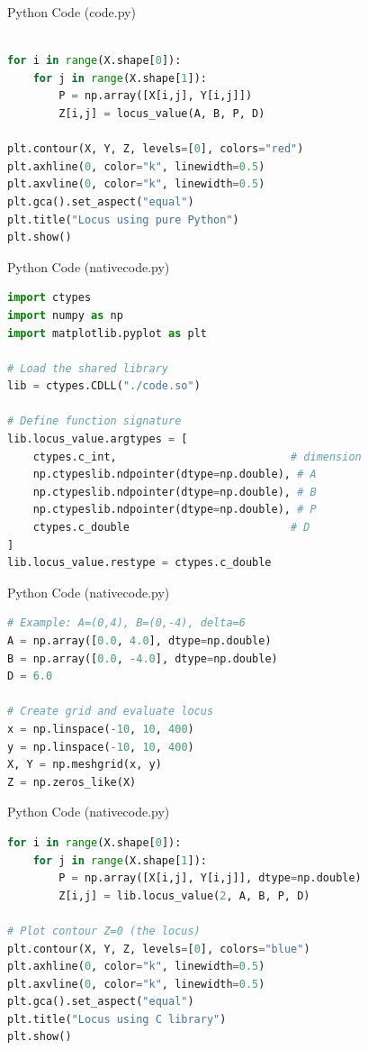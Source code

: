 \documentclass{beamer}
\begin{document}
\begin{frame}[fragile]{Python Code (code.py)}
\begin{lstlisting}[language=Python]

for i in range(X.shape[0]):
    for j in range(X.shape[1]):
        P = np.array([X[i,j], Y[i,j]])
        Z[i,j] = locus_value(A, B, P, D)

plt.contour(X, Y, Z, levels=[0], colors="red")
plt.axhline(0, color="k", linewidth=0.5)
plt.axvline(0, color="k", linewidth=0.5)
plt.gca().set_aspect("equal")
plt.title("Locus using pure Python")
plt.show()
\end{lstlisting}
\end{frame}
\begin{frame}[fragile]{Python Code (nativecode.py)}
\begin{lstlisting}[language=Python]
import ctypes
import numpy as np
import matplotlib.pyplot as plt

# Load the shared library
lib = ctypes.CDLL("./code.so")

# Define function signature
lib.locus_value.argtypes = [
    ctypes.c_int,                           # dimension
    np.ctypeslib.ndpointer(dtype=np.double), # A
    np.ctypeslib.ndpointer(dtype=np.double), # B
    np.ctypeslib.ndpointer(dtype=np.double), # P
    ctypes.c_double                         # D
]
lib.locus_value.restype = ctypes.c_double
\end{lstlisting}
\end{frame}
\begin{frame}[fragile]{Python Code (nativecode.py)}
\begin{lstlisting}[language=Python]
# Example: A=(0,4), B=(0,-4), delta=6
A = np.array([0.0, 4.0], dtype=np.double)
B = np.array([0.0, -4.0], dtype=np.double)
D = 6.0

# Create grid and evaluate locus
x = np.linspace(-10, 10, 400)
y = np.linspace(-10, 10, 400)
X, Y = np.meshgrid(x, y)
Z = np.zeros_like(X)
\end{lstlisting}
\end{frame}

\begin{frame}[fragile]{Python Code (nativecode.py)}
\begin{lstlisting}[language=Python]
for i in range(X.shape[0]):
    for j in range(X.shape[1]):
        P = np.array([X[i,j], Y[i,j]], dtype=np.double)
        Z[i,j] = lib.locus_value(2, A, B, P, D)

# Plot contour Z=0 (the locus)
plt.contour(X, Y, Z, levels=[0], colors="blue")
plt.axhline(0, color="k", linewidth=0.5)
plt.axvline(0, color="k", linewidth=0.5)
plt.gca().set_aspect("equal")
plt.title("Locus using C library")
plt.show()
\end{lstlisting}
\end{frame}
\end{document}
